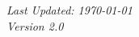 \documentclass[11pt,a4paper]{article}
\begin{document}

\vfill
\begin{center}
\textit{Last Updated: \today}\\
\textit{Version 2.0}
\end{center}
\end{document}
